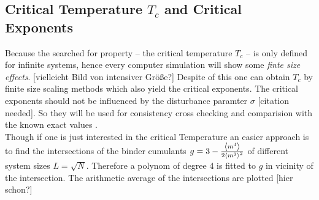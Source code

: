 \subsection{Critical Temperature $T_c$ and Critical Exponents}
    Because the searched for property -- the critical temperature \(T_c\)
    -- is only defined for infinite systems, hence every computer
    simulation will show some \emph{finte size effects}.
    [vielleicht Bild von intensiver Größe?]
    Despite of this one can obtain \(T_c\) by finite size scaling
    methods \cite[S. ??]{Newman1998} which also yield the critical
    exponents. The critical exponents should not be influenced by the
    disturbance paramter \(\sigma\) [citation needed]. So they will be
    used for consistency cross checking and comparision with the known
    exact values \cite[S. 59]{Pelissetto2002}.\\
    Though if one is just interested in the critical Temperature an
    easier approach is to find the intersections of the binder cumulants
    \(g = 3-\frac{\left< m^4 \right>}{2\left< m^2 \right>^2}\) \cite{Binder1981} of different
    system sizes \(L=\sqrt N\).
    Therefore a polynom of degree 4 is fitted to \(g\) in vicinity of
    the intersection. %
    The arithmetic average of the intersections are plotted [hier schon?]
    \\

